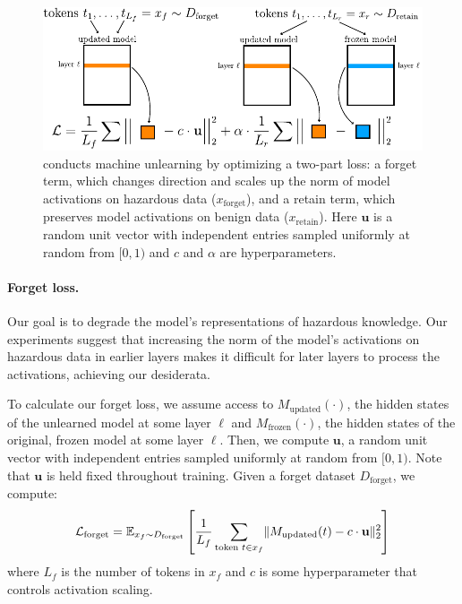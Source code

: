 \begin{figure}[b!]
    \centering
    \includegraphics[scale=0.85]{figures/method_2.pdf}
    \caption{\method{} conducts machine unlearning by optimizing a two-part loss: a forget term, which changes direction and scales up the norm of model activations on hazardous data ($x_{\text{forget}}$), and a retain term, which preserves model activations on benign data ($x_{\text{retain}}$). Here $\mathbf{u}$ is a random unit vector with independent entries sampled uniformly at random from $[0, 1)$ and $c$ and $\alpha$ are hyperparameters.} %
    \label{fig:method}
\end{figure}


\paragraph{Forget loss.} Our goal is to degrade the model's representations of hazardous knowledge. Our experiments suggest that increasing the norm of the model's activations on hazardous data in earlier layers makes it difficult for later layers to process the activations, achieving our desiderata. %





To calculate our forget loss, we assume access to $M_\text{updated}(\cdot)$, the hidden states of the unlearned model at some layer $\ell$ and $M_\text{frozen}(\cdot)$, the hidden states of the original, frozen model at some layer $\ell$. Then, we compute $\mathbf{u}$, a random unit vector with independent entries sampled uniformly at random from $[0, 1)$. Note that $\mathbf{u}$ is held fixed throughout training. Given a forget dataset $D_\text{forget}$, we compute: \[\mathcal{L}_\text{forget} = \mathbb{E}_{x_f \sim D_\text{forget}}\left[\frac{1}{L_f}\sum_{\text{token } t \in x_f} \lVert M_\text{updated}(t) - c \cdot \mathbf{u}\rVert_2^2 \right]\] where $L_f$ is the number of tokens in $x_f$ and $c$ is some hyperparameter that controls activation scaling. %


